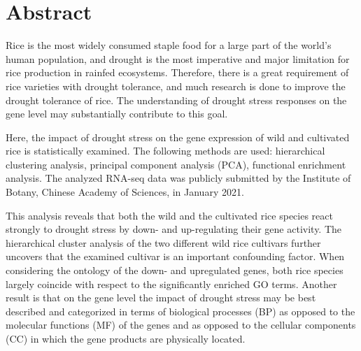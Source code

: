 \section{Abstract}

Rice is the most widely consumed staple food for a large part of the world's human population, and drought is the most imperative and major limitation for rice production in rainfed ecosystems. Therefore, there is a great requirement of rice varieties with drought tolerance, and much research is done to improve the drought tolerance of rice. The understanding of drought stress responses on the gene level may substantially contribute to this goal.

Here, the impact of drought stress on the gene expression of wild and cultivated rice is statistically examined. The following methods are used: hierarchical clustering analysis, principal component analysis (PCA), functional enrichment analysis. The analyzed RNA-seq data was publicly submitted by the Institute of Botany, Chinese Academy of Sciences, in January 2021.

This analysis reveals that both the wild and the cultivated rice species react strongly to drought stress by down- and up-regulating their gene activity. The hierarchical cluster analysis of the two different wild rice cultivars further uncovers that the examined cultivar is an important confounding factor. When considering the ontology of the down- and upregulated genes, both rice species largely coincide with respect to the significantly enriched GO terms. Another result is that on the gene level the impact of drought stress may be best described and categorized in terms of biological processes (BP) as opposed to the molecular functions (MF) of the genes and as opposed to the cellular components (CC) in which the gene products are physically located.